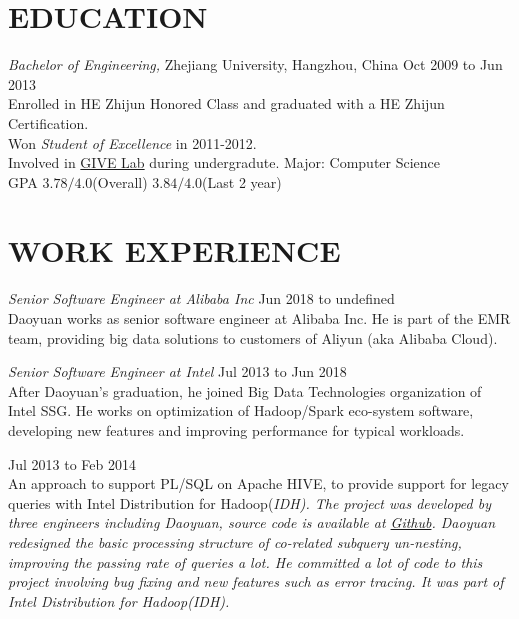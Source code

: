\documentclass[line,margin]{res}
\begin{document}
\address{Cellphone:\sl +86-152-1686-1267}
\address{E-mail:\sl me at daoyuan.wang}


\begin{resume}

\section{EDUCATION} {\sl Bachelor of Engineering,} Zhejiang University, Hangzhou, China \hfill Oct 2009 to Jun 2013\\
                Enrolled in HE Zhijun Honored Class and graduated with a HE Zhijun Certification.\\
                Won {\sl Student of Excellence} in 2011-2012.\\
                Involved in \href{http://give.zju.edu.cn/en/portal/index.html}{GIVE Lab} during undergradute.
                Major: Computer Science \\
                GPA $3.78/4.0$(Overall) $3.84/4.0$(Last 2 year)

\section{WORK EXPERIENCE}
     {\sl Senior Software Engineer at Alibaba Inc} \hfill         Jun 2018 to undefined\\
    Daoyuan works as senior software engineer at Alibaba Inc. He is part of the EMR team, providing big data solutions to customers of Aliyun (aka Alibaba Cloud).

    {\sl Senior Software Engineer at Intel} \hfill         Jul 2013 to Jun 2018\\
    After Daoyuan's graduation, he joined Big Data Technologies organization of Intel SSG. He works on optimization of Hadoop/Spark eco-system software, developing new features and improving performance for typical workloads.
        \begin{outline}
             \hfill        Jul 2013 to Feb 2014\\
                An approach to support PL/SQL on Apache HIVE, to provide support for legacy queries with Intel Distribution for Hadoop(\sl IDH). The project was developed by three engineers including Daoyuan, source code is available at \href{https://github.com/intel-hadoop/project-panthera}{Github}. Daoyuan redesigned the basic processing structure of co-related subquery un-nesting, improving the passing rate of queries a lot. He committed a lot of code to this project involving bug fixing and new features such as error tracing. It was part of Intel Distribution for Hadoop(\sl IDH).


\end{outline}
\end{resume}
\end{document}
